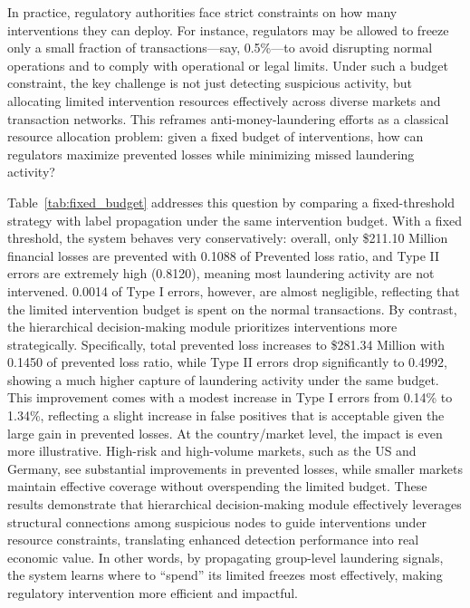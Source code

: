 \documentclass[11pt,english]{article}
\begin{document}
In practice, regulatory authorities face strict constraints on how many interventions they can deploy. For instance, regulators may be allowed to freeze only a small fraction of transactions—say, 0.5\%—to avoid disrupting normal operations and to comply with operational or legal limits. Under such a budget constraint, the key challenge is not just detecting suspicious activity, but allocating limited intervention resources effectively across diverse markets and transaction networks. This reframes anti-money-laundering efforts as a classical resource allocation problem: given a fixed budget of interventions, how can regulators maximize prevented losses while minimizing missed laundering activity?

Table~\ref{tab:fixed_budget} addresses this question by comparing a fixed-threshold strategy with label propagation under the same intervention budget. With a fixed threshold, the system behaves very conservatively: overall, only \$211.10 Million financial losses are prevented with 0.1088 of Prevented loss ratio, and Type II errors are extremely high (0.8120), meaning most laundering activity are not intervened. 0.0014 of Type I errors, however, are almost negligible, reflecting that the limited intervention budget is spent on the normal transactions. By contrast, the hierarchical decision-making module prioritizes interventions more strategically. Specifically, total prevented loss increases to \$281.34 Million with 0.1450 of prevented loss ratio, while Type II errors drop significantly to 0.4992, showing a much higher capture of laundering activity under the same budget. This improvement comes with a modest increase in Type I errors from 0.14\% to 1.34\%, reflecting a slight increase in false positives that is acceptable given the large gain in prevented losses. At the country/market level, the impact is even more illustrative. High-risk and high-volume markets, such as the US and Germany, see substantial improvements in prevented losses, while smaller markets maintain effective coverage without overspending the limited budget. These results demonstrate that hierarchical decision-making module effectively leverages structural connections among suspicious nodes to guide interventions under resource constraints, translating enhanced detection performance into real economic value. In other words, by propagating group-level laundering signals, the system learns where to “spend” its limited freezes most effectively, making regulatory intervention more efficient and impactful.
\end{document}
